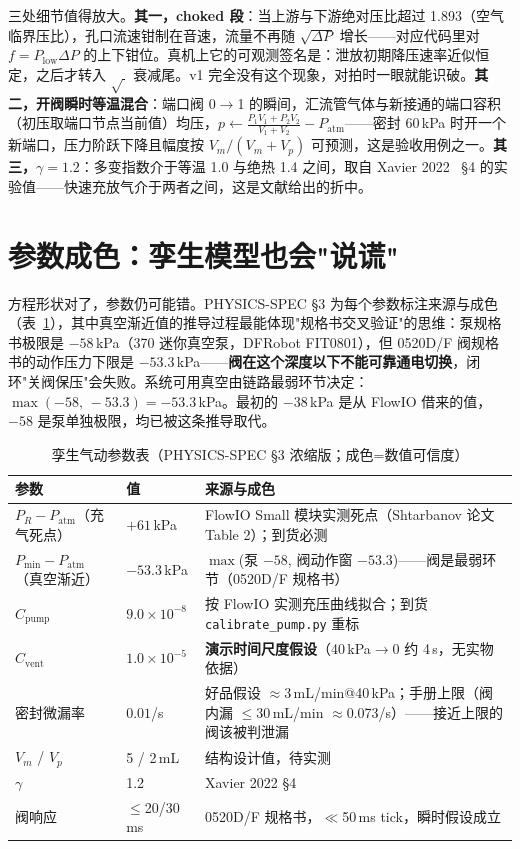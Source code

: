 三处细节值得放大。\textbf{其一，choked 段}：当上游与下游绝对压比超过 1.893（空气临界压比），孔口流速钳制在音速，流量不再随 $\sqrt{\Delta P}$ 增长——对应代码里对 $f=P_\text{low}\Delta P$ 的上下钳位。真机上它的可观测签名是：泄放初期降压速率近似恒定，之后才转入 $\sqrt{\ }$ 衰减尾。v1 完全没有这个现象，对拍时一眼就能识破。\textbf{其二，开阀瞬时等温混合}：端口阀 0$\to$1 的瞬间，汇流管气体与新接通的端口容积（初压取端口节点当前值）均压，$p \leftarrow \frac{P_1V_1+P_2V_2}{V_1+V_2}-P_\text{atm}$——密封 60\,kPa 时开一个新端口，压力阶跃下降且幅度按 $V_m/(V_m+V_p)$ 可预测，这是验收用例之一。\textbf{其三，$\gamma{=}1.2$}：多变指数介于等温 1.0 与绝热 1.4 之间，取自 Xavier 2022~\cite{Xavier2022Frontiers} \S4 的实验值——快速充放气介于两者之间，这是文献给出的折中。

\section{参数成色：孪生模型也会"说谎"}
\label{sec:twin-params}

方程形状对了，参数仍可能错。PHYSICS-SPEC \S3 为每个参数标注来源与成色（表~\ref{tab:twin-params}），其中真空渐近值的推导过程最能体现"规格书交叉验证"的思维：泵规格书极限是 $-58$\,kPa（370 迷你真空泵，DFRobot FIT0801），但 0520D/F 阀规格书的动作压力下限是 $-53.3$\,kPa——\textbf{阀在这个深度以下不能可靠通电切换}，闭环"关阀保压"会失败。系统可用真空由链路最弱环节决定：$\max(-58,\,-53.3)=-53.3$\,kPa。最初的 $-38$\,kPa 是从 FlowIO 借来的值，$-58$ 是泵单独极限，均已被这条推导取代。

\begin{table}[htbp]
  \centering
  \caption{孪生气动参数表（PHYSICS-SPEC \S3 浓缩版；成色=数值可信度）}
  \label{tab:twin-params}
  \begin{tabular}{llp{5.5cm}}
    \toprule
    参数 & 值 & 来源与成色 \\
    \midrule
    $P_R-P_\text{atm}$（充气死点） & $+61$\,kPa & FlowIO Small 模块实测死点（Shtarbanov 论文 Table 2）；到货必测 \\
    $P_\text{min}-P_\text{atm}$（真空渐近） & $-53.3$\,kPa & $\max$(泵 $-58$, 阀动作窗 $-53.3$)——阀是最弱环节（0520D/F 规格书） \\
    $C_\text{pump}$ & $9.0\times10^{-8}$ & 按 FlowIO 实测充压曲线拟合；到货 \texttt{calibrate\_pump.py} 重标 \\
    $C_\text{vent}$ & $1.0\times10^{-5}$ & \textbf{演示时间尺度假设}（40\,kPa$\to$0 约 4\,s，无实物依据） \\
    密封微漏率 & $0.01$/s & 好品假设 $\approx$3\,mL/min@40\,kPa；手册上限（阀内漏 $\le$30\,mL/min $\approx$0.073/s）——接近上限的阀该被判泄漏 \\
    $V_m$ / $V_p$ & 5 / 2\,mL & 结构设计值，待实测 \\
    $\gamma$ & 1.2 & Xavier 2022 \S4 \\
    阀响应 & $\le$20/30\,ms & 0520D/F 规格书，$\ll$50\,ms tick，瞬时假设成立 \\
    \bottomrule
  \end{tabular}
\end{table}

